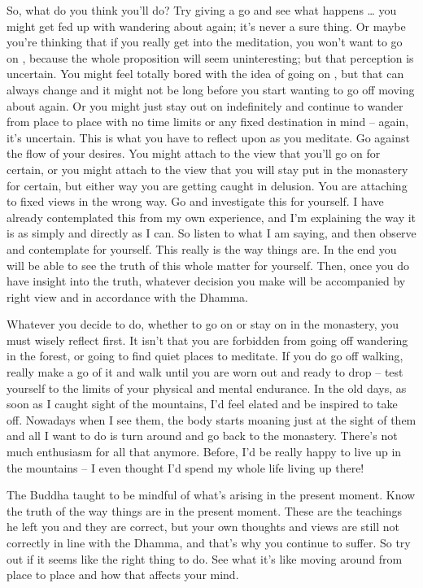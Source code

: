 So, what do you think you'll do? Try giving  a go and see what happens \ldots{} you might get fed up with wandering about again; it's never a sure thing. Or maybe you're thinking that if you really get into the meditation, you won't want to go on , because the whole proposition will seem uninteresting; but that perception is uncertain. You might feel totally bored with the idea of going on , but that can always change and it might not be long before you start wanting to go off moving about again. Or you might just stay out on  indefinitely and continue to wander from place to place with no time limits or any fixed destination in mind -- again, it's uncertain. This is what you have to reflect upon as you meditate. Go against the flow of your desires. You might attach to the view that you'll go on  for certain, or you might attach to the view that you will stay put in the monastery for certain, but either way you are getting caught in delusion. You are attaching to fixed views in the wrong way. Go and investigate this for yourself. I have already contemplated this from my own experience, and I'm explaining the way it is as simply and directly as I can. So listen to what I am saying, and then observe and contemplate for yourself. This really is the way things are. In the end you will be able to see the truth of this whole matter for yourself. Then, once you do have insight into the truth, whatever decision you make will be accompanied by right view and in accordance with the Dhamma.

Whatever you decide to do, whether to go on  or stay on in the monastery, you must wisely reflect first. It isn't that you are forbidden from going off wandering in the forest, or going to find quiet places to meditate. If you do go off walking, really make a go of it and walk until you are worn out and ready to drop -- test yourself to the limits of your physical and mental endurance. In the old days, as soon as I caught sight of the mountains, I'd feel elated and be inspired to take off. Nowadays when I see them, the body starts moaning just at the sight of them and all I want to do is turn around and go back to the monastery. There's not much enthusiasm for all that anymore. Before, I'd be really happy to live up in the mountains -- I even thought I'd spend my whole life living up there!

The Buddha taught to be mindful of what's arising in the present moment. Know the truth of the way things are in the present moment. These are the teachings he left you and they are correct, but your own thoughts and views are still not correctly in line with the Dhamma, and that's why you continue to suffer. So try out  if it seems like the right thing to do. See what it's like moving around from place to place and how that affects your mind.

